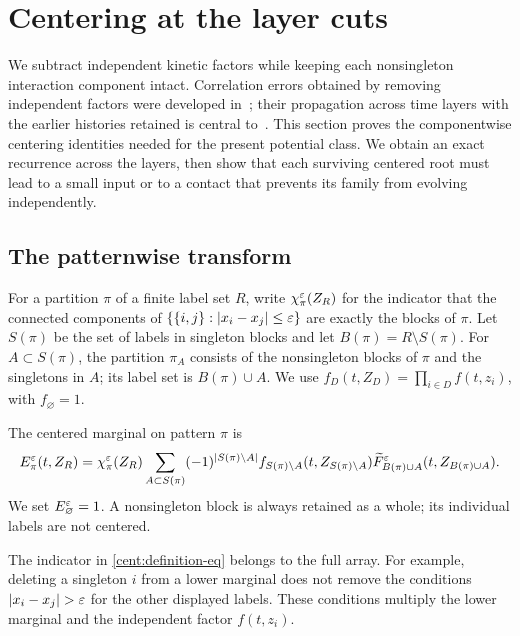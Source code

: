 \section{Centering at the layer cuts}\label{sec:centering}

We subtract independent kinetic factors while keeping each nonsingleton
interaction component intact. Correlation errors obtained by removing
independent factors were developed in~\cite{PulvirentiSimonella2017};
their propagation across time layers with the earlier histories retained
is central to~\cite{DHM25}. This section proves the componentwise
centering identities needed for the present potential class. We obtain
an exact recurrence across the layers, then show that each surviving
centered root must lead to a small input or to a contact that prevents
its family from evolving independently.

\subsection{The patternwise transform}
For a partition $\pi$ of a finite label set $R$, write
$\chi_\pi^\varepsilon(Z_R)$ for the indicator that the connected components of
$\{\{i,j\}:|x_i-x_j|\leq\varepsilon\}$ are exactly the blocks of $\pi$.
Let $S(\pi)$ be the set of labels in singleton blocks and let
$B(\pi)=R\setminus S(\pi)$. For $A\subset S(\pi)$, the partition
$\pi_A$ consists of the nonsingleton blocks of $\pi$ and the singletons
in $A$; its label set is $B(\pi)\cup A$. We use
$f_D(t,Z_D)=\prod_{i\in D}f(t,z_i)$, with $f_\varnothing=1$.

\begin{definition}\label{cent:definition}
The centered marginal on pattern $\pi$ is
\begin{equation}\label{cent:definition-eq}
 E_\pi^\varepsilon(t,Z_R)=\chi_\pi^\varepsilon(Z_R)
 \sum_{A\subset S(\pi)}(-1)^{|S(\pi)\setminus A|}
 f_{S(\pi)\setminus A}(t,Z_{S(\pi)\setminus A})
 \widetilde F_{B(\pi)\cup A}^\varepsilon(t,Z_{B(\pi)\cup A}).
\end{equation}
We set $E_\varnothing^\varepsilon=1$. A nonsingleton block is always retained
as a whole; its individual labels are not centered.
\end{definition}

The indicator in \eqref{cent:definition-eq} belongs to the full array.
For example, deleting a singleton $i$ from a lower marginal does not
remove the conditions $|x_i-x_j|>\eps$ for the other displayed labels.
These conditions multiply the lower marginal and the independent
factor $f(t,z_i)$.

